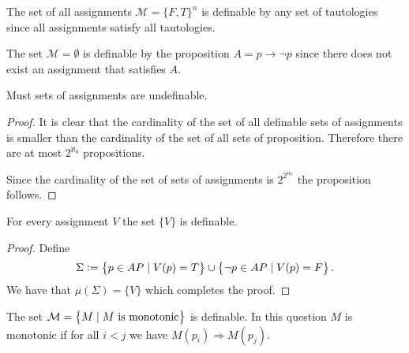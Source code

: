 \documentclass[11pt,a4paper]{article}
\renewcommand{\implies}{\rightarrow}
\begin{document}
  \begin{example}
    The set of all assignments $\mathcal M = \{F, T\}^{n}$ is definable
    by any set of tautologies since all assignments satisfy all tautologies.
  \end{example}
  \begin{example}
    The set $\mathcal M = \emptyset$ is definable by the proposition
    $A = p \implies \neg p$ since there does not exist an assignment
    that satisfies $A$.
  \end{example}

  \begin{proposition}
    Must sets of assignments are undefinable.
  \end{proposition}
  \begin{proof}
    It is clear that the cardinality of the set of all definable sets of 
    assignments is smaller than the cardinality of the set of all
    sets of proposition. Therefore there are at most $2^{\aleph_0}$
    propositions.

    Since the cardinality of the set of sets of assignments is
    $2^{2^{\alpha_0}}$ the proposition follows.
  \end{proof}

  \begin{proposition}
    For every assignment $V$ the set $\{V\}$ is definable.
  \end{proposition}
  \begin{proof}
    Define
    \[
      \Sigma :=
      \set{p \in AP \mid V(p) = T} \cup
      \set{\neg p \in AP \mid V(p) = F}.
    \]
    We have that $\mu(\Sigma) = \{V\}$ which completes the proof.
  \end{proof}

  \begin{proposition}
    The set $\mathcal M = \set{M \mid M \text{ is monotonic}}$ is definable.
    In this question $M$ is monotonic if for all $i < j$ we have
    $M(p_i) \Rightarrow M(p_j)$.
  \end{proposition}
\end{document}

